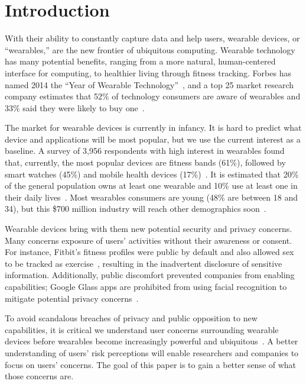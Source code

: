 \documentclass{acm_proc_article-sp}
\begin{document}



\section{Introduction}
With their ability to constantly capture data and help users, wearable devices, or ``wearables,'' are the new frontier of ubiquitous computing. Wearable technology has many potential benefits, ranging from a more natural, human-centered interface for computing, to healthier living through fitness tracking. Forbes has named 2014 the ``Year of Wearable Technology''~\cite{Forbes}, and a top 25 market research company estimates that 52\% of technology consumers are aware of wearables and 33\% said they were likely to buy one~\cite{NPD}. 

The market for wearable devices is currently in infancy. It is hard to predict what device and applications will be most popular, but we use the current interest as a baseline. A survey of 3,956 respondents with high interest in wearables found that, currently, the most popular devices are fitness bands (61\%), followed by smart watches (45\%) and mobile health devices (17\%)~\cite{Nilsen}. It is estimated that 20\% of the general population owns at least one wearable and 10\% use at least one in their daily lives~\cite{WearableStatNews}. Most wearables consumers are young (48\% are between 18 and 34), but this \$700 million industry will reach other demographics soon~\cite{cmo}. 

Wearable devices bring with them new potential security and privacy concerns. Many concerns exposure of users' activities without their awareness or consent. For instance, Fitbit's fitness profiles were public by default and also allowed sex to be tracked as exercise~\cite{Fitbit}, resulting in the inadvertent disclosure of sensitive information. Additionally, public discomfort prevented companies from enabling capabilities; Google Glass apps are prohibited from using facial recognition to mitigate potential privacy concerns~\cite{GlassDetection}.

To avoid scandalous breaches of privacy and public opposition to new capabilities, it is critical we understand user concerns surrounding wearable devices before wearables become increasingly powerful and ubiquitous~\cite{Implants}. A better understanding of users' risk perceptions will enable researchers and companies to focus on users' concerns. The goal of this paper is to gain a better sense of what those concerns are. 
\end{document}
